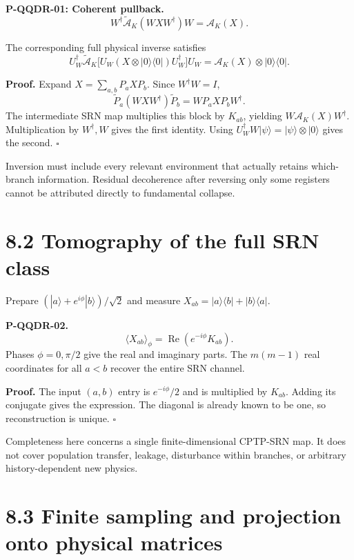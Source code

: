 \documentclass[
  11pt,
  oneside]{book}
\begin{document}
\label{p-qqdr-01}{}

\textbf{P-QQDR-01: Coherent pullback.} \[
W^\dagger\widetilde{\mathcal A}_K(WXW^\dagger)W=\mathcal A_K(X).
\]

The corresponding full physical inverse satisfies \[
U_W^\dagger\widetilde{\mathcal A}_K
\bigl[U_W(X\otimes|0\rangle\langle0|)U_W^\dagger\bigr]U_W
=\mathcal A_K(X)\otimes|0\rangle\langle0|.
\]

\textbf{Proof.} Expand \(X=\sum_{a,b}P_aXP_b\). Since \(W^\dagger W=I\),
\[
\widetilde P_a(WXW^\dagger)\widetilde P_b=WP_aXP_bW^\dagger.
\] The intermediate SRN map multiplies this block by \(K_{ab}\),
yielding \(W\mathcal A_K(X)W^\dagger\). Multiplication by
\(W^\dagger,W\) gives the first identity. Using
\(U_W^\dagger W|\psi\rangle=|\psi\rangle\otimes|0\rangle\) gives the
second. \(\square\)

Inversion must include every relevant environment that actually retains
which-branch information. Residual decoherence after reversing only some
registers cannot be attributed directly to fundamental collapse.

\section{8.2 Tomography of the full SRN class}

Prepare \((|a\rangle+e^{i\phi}|b\rangle)/\sqrt2\) and measure
\(X_{ab}=|a\rangle\langle b|+|b\rangle\langle a|\).

\label{p-qqdr-02}{}

\textbf{P-QQDR-02.} \[
\langle X_{ab}\rangle_\phi
=\operatorname{Re}(e^{-i\phi}K_{ab}).
\] Phases \(\phi=0,\pi/2\) give the real and imaginary parts. The
\(m(m-1)\) real coordinates for all \(a<b\) recover the entire SRN
channel.

\textbf{Proof.} The input \((a,b)\) entry is \(e^{-i\phi}/2\) and is
multiplied by \(K_{ab}\). Adding its conjugate gives the expression. The
diagonal is already known to be one, so reconstruction is unique.
\(\square\)

Completeness here concerns a single finite-dimensional CPTP-SRN map. It
does not cover population transfer, leakage, disturbance within
branches, or arbitrary history-dependent new physics.

\section{8.3 Finite sampling and projection onto physical matrices}
\end{document}
